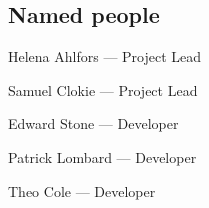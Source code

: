 \documentclass[a4paper, 10pt]{article}
\begin{document}
\subsection{Named people}
\begin{description}[align=right,labelwidth=2cm]
    \setlength\itemsep{-0.3em}
    \item [HA]  Helena Ahlfors --- Project Lead
    \item [SC]  Samuel Clokie --- Project Lead
    \item [ES]  Edward Stone --- Developer
    \item [PL]  Patrick Lombard --- Developer
    \item [TC]  Theo Cole --- Developer
\end{description}




\end{document}
